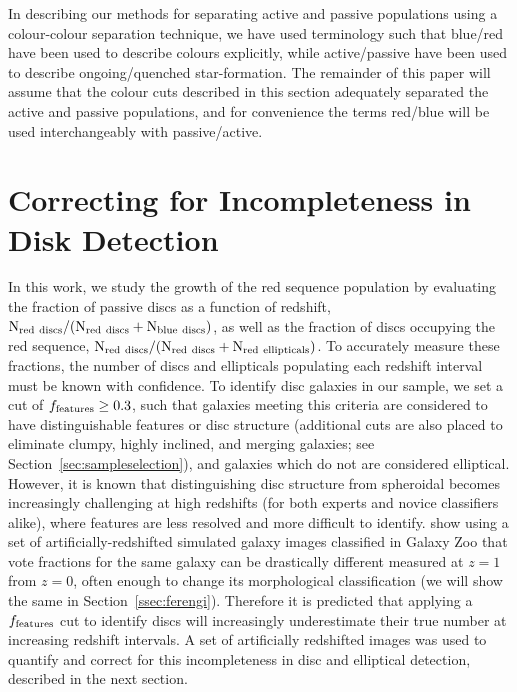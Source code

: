 \documentclass[useAMS,usenatbib]{mn2e}
\begin{document}
In describing our methods for separating active and passive populations using a colour-colour separation technique, we have used terminology such that blue/red have been used to describe colours explicitly, while active/passive have been used to describe ongoing/quenched star-formation. The remainder of this paper will assume that the colour cuts described in this section adequately separated the active and passive populations, and for convenience the terms red/blue will be used interchangeably with passive/active.  

\section{Correcting for Incompleteness in Disk Detection}
\label{sec:correction}
In this work, we study the growth of the red sequence population by evaluating the fraction of passive discs as a function of redshift, $\rm N_{red~discs}/(N_{red~discs}+N_{blue~discs})$, as well as the fraction of discs occupying the red sequence, $\rm N_{red~discs}/(N_{red~discs}+N_{red~ellipticals})$. To accurately measure these fractions, the number of discs and ellipticals populating each redshift interval must be known with confidence. To identify disc galaxies in our sample, we set a cut of $f_{\rm features}\ge0.3$, such that galaxies meeting this criteria are considered to have distinguishable features or disc structure (additional cuts are also placed to eliminate clumpy, highly inclined, and merging galaxies; see Section~\ref{sec:sampleselection}), and galaxies which do not are considered elliptical. However, it is known that distinguishing disc structure from spheroidal becomes increasingly challenging at high redshifts (for both experts and novice classifiers alike), where features are less resolved and more difficult to identify. \citet{Willett2016} show using a set of artificially-redshifted simulated galaxy images classified in Galaxy Zoo that vote fractions for the same galaxy can be drastically different measured at $z=1$ from $z=0$, often enough to change its morphological classification (we will show the same in Section~\ref{ssec:ferengi}).  Therefore it is predicted that applying a $f_{\rm features}$ cut to identify discs will increasingly underestimate their true number at increasing redshift intervals. A set of artificially redshifted images was used to quantify and correct for this incompleteness in disc and elliptical detection, described in the next section.
 
\end{document}
